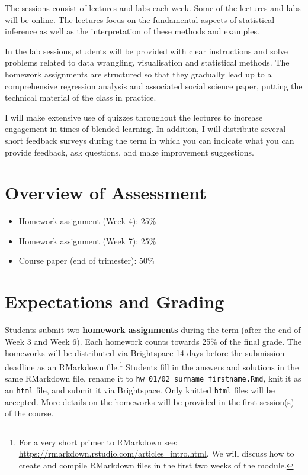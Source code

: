 \documentclass[abstract=on,parskip=full,headings=standardclasses,fontsize=11pt,paper=a4]{scrartcl}
\begin{document}
The sessions consist of lectures and labs each week. Some of the lectures and labs will be online. The lectures focus on the fundamental aspects of statistical inference as well as the interpretation of these methods and examples. %

In the  lab sessions, students will be provided with clear instructions and solve problems related to data wrangling, visualisation and statistical methods. The homework assignments are structured so that they gradually lead up to a comprehensive regression analysis and associated social science paper, putting the technical material of the class in practice.

I will make extensive use of quizzes  throughout the lectures to increase engagement in times of blended learning. In addition, I will distribute several short feedback surveys during the term in which you can indicate what you can provide feedback, ask questions, and make improvement suggestions. 

\section*{Overview of Assessment}

\begin{itemize}
\item Homework assignment (Week 4): 25\% 
\item Homework assignment  (Week 7): 25\% 
\item Course paper (end of trimester): 50\%
\end{itemize}


\section*{Expectations and Grading}


Students submit two \textbf{homework assignments} during the term (after the end of Week 3 and Week 6). Each homework counts towards 25\% of the final grade.  The homeworks will be distributed via Brightspace 14 days before the submission deadline as an RMarkdown file.\footnote{For a very short primer to RMarkdown see: \url{https://rmarkdown.rstudio.com/articles_intro.html}. We will discuss how to create and compile RMarkdown files in the first two weeks of the module.} Students fill in the answers and solutions in the same RMarkdown file, rename it to \texttt{hw\_01/02\_surname\_firstname.Rmd}, knit it as an \texttt{html} file, and submit it via Brightspace. Only knitted \texttt{html} files will be accepted. More details on the homeworks will be provided in the first session(s) of the course.
\end{document}
